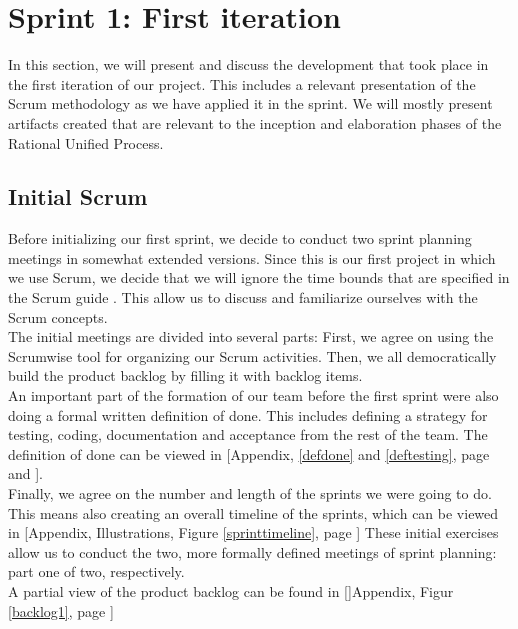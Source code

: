 \section{Sprint 1: First iteration}
In this section, we will present and discuss the development that took place in the first iteration of our project. This includes a relevant presentation of the Scrum methodology as we have applied it in the sprint. We will mostly present artifacts created that are relevant to the inception and elaboration phases of the Rational Unified Process.
\subsection{Initial Scrum}
Before initializing our first sprint, we decide to conduct two sprint planning meetings in somewhat extended versions. Since this is our first project in which we use Scrum, we decide that we will ignore the time bounds that are specified in the Scrum guide \cite[p.~9]{scrumguide}. This allow us to discuss and familiarize ourselves with the Scrum concepts.\\
The initial meetings are divided into several parts: First, we agree on using the Scrumwise \cite{scrumwise} tool for organizing our Scrum activities. Then, we all democratically build the product backlog by filling it with backlog items. \\
An important part of the formation of our team before the first sprint were also doing a formal written definition of done. This includes defining a strategy for testing, coding, documentation and acceptance from the rest of the team. The definition of done can be viewed in [Appendix, \ref{defdone} and \ref{deftesting}, page \pageref{defdone} and \pageref{deftesting}].\\
Finally, we agree on the number and length of the sprints we were going to do. This means also creating an overall timeline of the sprints, which can be viewed in [Appendix, Illustrations, Figure \ref{sprinttimeline}, page \pageref{sprinttimeline}] These initial exercises allow us to conduct the two, more formally defined meetings of sprint planning: part one of two, respectively. \\
A partial view of the product backlog can be found in []Appendix, Figur \ref{backlog1}, page \pageref{backlog1}]
